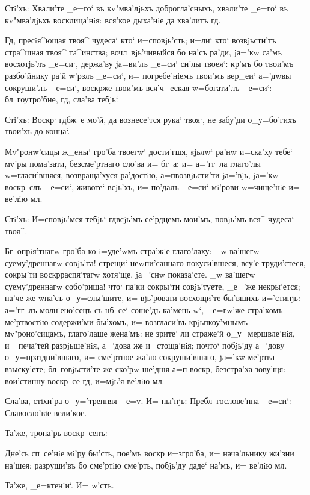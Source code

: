 Стi'хъ: Хвали'те _е=го` въ кv"мва'лjьхъ 
доброгла'сныхъ, хвали'те _е=го` въ кv"мва'лjьхъ 
восклица'нiя: вся'кое дыха'нiе да хва'литъ гд.

Гд, пресiя^ющая твоя^ чудеса` кто` и=сповjь'сть; 
и=ли` кто` возвjьсти'тъ стра^шная твоя^ та^инства; 
вочл~вjь'чивыйся бо на'съ ра'ди, jа='кw са'мъ восхотjь'лъ 
_е=си`, держа'ву jа=ви'лъ _е=си` си'лы твоея`: кр'мъ 
бо твои'мъ разбо'йнику ра'й w'рзлъ _е=си`, и= 
погребе'нiемъ твои'мъ вер_еи` а='дwвы сокруши'лъ _е=си`, 
воскр же твои'мъ вся'ч_еская w=богати'лъ _е=си`: 
бл~гоутро'бне, гд, сла'ва тебjь`.

Стi'хъ: Воскр` гд бж~е мо'й, да вознесе'тся 
рука` твоя`, не забу'ди о_у=бо'гихъ твои'хъ до конца`.

Мv"ронw'сицы ж_ены` гро'ба твоегw` дости'гшя, sjьлw` 
ра'нw и=ска'ху тебе` мv'ры пома'зати, безсме'ртнаго 
сло'ва и= бг~а: и= а='гг~ла глаго'лы w=гласи'вшяся, 
возвраща'хуся ра'достiю, а=п возвjьсти'ти jа='вjь, 
jа='кw воскр~слъ _е=си`, животе` всjь'хъ, и= по'далъ 
_е=си` мi'рови w=чище'нiе и= ве'лiю мл.

Стi'хъ: И=сповjь'мся тебjь` гд всjь'мъ се'рдцемъ 
мои'мъ, повjь'мъ вся^ чудеса` твоя^.

Бг~опрiя'тнагw гро'ба ко i=уде'wмъ стра'жiе 
глаго'лаху: _w ва'шегw суему'дреннагw совjь'та! стрещи` 
неwпи'саннаго покуси'вшеся, всу'е труди'стеся, сокры'ти 
воскр распя'тагw хотя'ще, jа='снw показа'сте. _w 
ва'шегw суему'дреннагw собо'рища! что` па'ки сокры'ти 
совjь'туете, _е='же некры'ется; па'че же w\т на'съ 
о_у=слы'шите, и= вjь'ровати восхощи'те бы'вшихъ 
и='стинjь: а='гг~лъ молнiено'сецъ съ нб~се` соше'дъ 
ка'мень w`, _е=гw'же стра'хомъ ме'ртвостiю 
содержи'ми бы'хомъ, и= возгласи'въ крjьпкоу'мнымъ 
мv"роно'сицамъ, глаго'лаше жена'мъ: не зрите' ли страже'й 
о_у=мерщвле'нiя, и= печа'тей разрjьше'нiя, а='дова же 
и=стоща'нiя; почто` побjь'ду а='дову о_у=праздни'вшаго, 
и= сме'ртное жа'ло сокруши'вшаго, jа='кw ме'ртва 
взыску'ете; бл~говjьсти'те же ско'рw ше'дшя а=п 
воскр, без\ъ стра'ха зову'щя: вои'стинну воскр~се 
гд, и=мjь'я ве'лiю мл.

Сла'ва, стiхи'ра о_у='тренняя _е=v. И= ны'нjь: 
Пребл~гослове'нна _е=си`: Славосло'вiе вели'кое. 

Та'же, тропа'рь воскр~сенъ:

Дне'сь сп~се'нiе мi'ру бы'сть, пое'мъ воскр 
и=з\ъ гро'ба, и= нача'льнику жи'зни на'шея: разруши'въ бо 
сме'ртiю сме'рть, побjь'ду даде` на'мъ, и= ве'лiю мл.

Та'же, _е=ктенiи`. И= w'стъ. 

